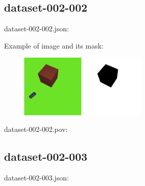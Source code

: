 \subsection{dataset-002-002}

dataset-002-002.json:
\begin{scriptsize}
\begin{ttfamily}

\end{ttfamily}
\end{scriptsize}

Example of image and its mask:
\begin{center}
\begin{figure}[H]
\centering\includegraphics[width=3cm]{./img-002-002.png}
\centering\includegraphics[width=3cm]{./mask-002-002.png}
\end{figure}
\end{center}

dataset-002-002.pov:
\begin{scriptsize}
\begin{ttfamily}

\end{ttfamily}
\end{scriptsize}

\subsection{dataset-002-003}

dataset-002-003.json:
\begin{scriptsize}
\begin{ttfamily}

\end{ttfamily}
\end{scriptsize}

